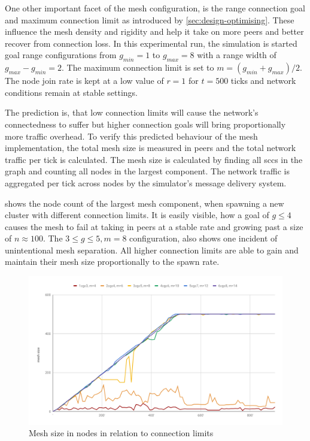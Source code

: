 One other important facet of the mesh configuration, is the range connection goal and maximum connection limit as introduced by \vref{sec:design-optimising}. These influence the mesh density and rigidity and help it take on more peers and better recover from connection loss. In this experimental run, the simulation is started goal range configurations from $g_{min}=1$ to $g_{max}=8$ with a range width of $g_{max}-g_{min}=2$. The maximum connection limit is set to $m=(g_{min}+g_{max})/2$. The node join rate is kept at a low value of $r=1$ for $t=500$ ticks and network conditions remain at stable settings.

The prediction is, that low connection limits will cause the network's connectedness to suffer but higher connection goals will bring proportionally more traffic overhead.
To verify this predicted behaviour of the mesh implementation, the total mesh size is measured in peers and the total network traffic per tick is calculated.
The mesh size is calculated by finding all \glspl{scc} in the graph and counting all nodes in the largest component. The network traffic is aggregated per tick across nodes by the simulator's message delivery system.

 shows the node count of the largest mesh component, when spawning a new cluster with different connection limits. It is easily visible, how a goal of $g\leq4$ causes the mesh to fail at taking in peers at a stable rate and growing past a size of $n\approx100$. The $3 \leq g \leq 5, m=8$ configuration, also shows one incident of unintentional mesh separation. All higher connection limits are able to gain and maintain their mesh size proportionally to the spawn rate.

\begin{figure}[htb!]
\centering
\includegraphics[width=1.0\textwidth]{graphics/analysis/connection-limit-largest-component.pdf}
\caption{Mesh size in nodes in relation to connection limits}
\label{fig:connection-limits-largest-component}
\end{figure}

